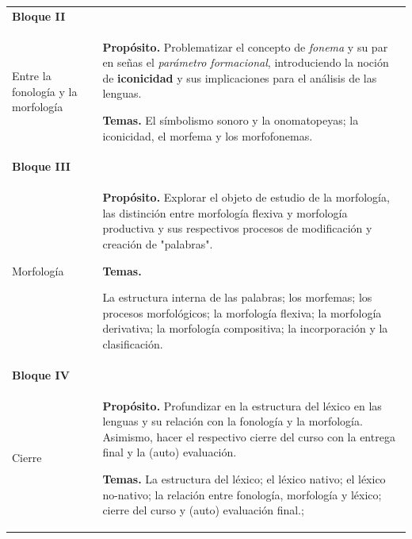 \begin{longtable}{@{}
    >{\raggedright\arraybackslash}p{}
    >{\raggedright\arraybackslash}p{}
@{}}
\midrule



\textbf{Bloque II}\\
Entre la fonología y la morfología
&
\textbf{Propósito.}
Problematizar el concepto de \textit{fonema} y su par en señas el 
\textit{parámetro formacional}, introduciendo la noción de \textbf{iconicidad} 
y sus implicaciones para el análisis de las lenguas.

\textbf{Temas.}
El símbolismo sonoro y la onomatopeyas; la iconicidad, el morfema y los morfofonemas.
\\

\midrule



\textbf{Bloque III}\\
Morfología
&
\textbf{Propósito.}
Explorar el objeto de estudio de la morfología, las distinción entre 
morfología flexiva y morfología productiva y sus respectivos procesos 
de modificación y creación de "palabras". 


\textbf{Temas.}

La estructura interna de las palabras; los morfemas; los procesos morfológicos; 
la morfología flexiva; la morfología derivativa; la morfología compositiva;
la incorporación y la clasificación.
\\

\midrule


\textbf{Bloque IV}\\
Cierre
&
\textbf{Propósito.}
Profundizar en la estructura del léxico en las lenguas y su relación con la fonología y la morfología.
Asimismo, hacer el respectivo cierre del curso con la entrega final y la (auto) evaluación.

\textbf{Temas.}
La estructura del léxico; el léxico nativo; el léxico no-nativo; la relación entre fonología, morfología y léxico; 
cierre del curso y (auto) evaluación final.;
\\

\end{longtable}

\endgroup

